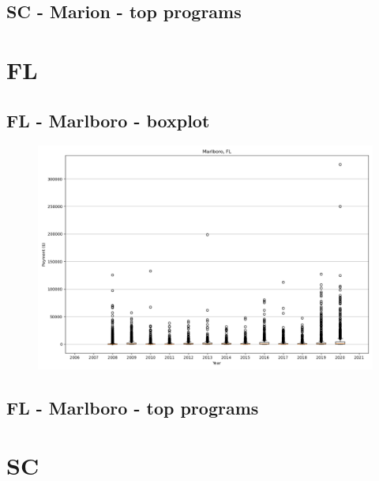 \subsection*{SC - Marion - top programs}

\newpage
\section*{FL}
\subsection*{FL - Marlboro - boxplot}
\begin{figure}[h]
\centering
\includegraphics[width=7in]{../output/boxplots/counties/Marlboro-FL_boxplot.png}
\end{figure}


\subsection*{FL - Marlboro - top programs}

\newpage
\section*{SC}
